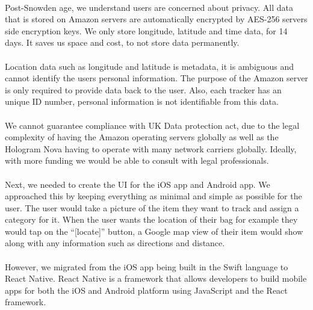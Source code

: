 \documentclass[12pt,a4paper]{article}
\begin{document}
        \paragraph{} Post-Snowden age, we understand users are concerned about privacy. All data that is stored on Amazon servers are automatically encrypted by AES-256 servers side encryption keys. We only store longitude, latitude and time data, for 14 days. It saves us space and cost, to not store data permanently.
        
        \paragraph{} Location data such as longitude and latitude is metadata, it is ambiguous and cannot identify the users personal information. The purpose of the Amazon server is only required to provide data back to the user. Also, each tracker has an unique ID number, personal information is not identifiable from this data. 
        
        \paragraph{} We cannot guarantee compliance with UK Data protection act, due to the legal complexity of having the Amazon operating servers globally as well as the Hologram Nova having to operate with many network carriers globally. Ideally, with more funding we would be able to consult with legal professionals. 
        
        \paragraph{} Next, we needed to create the UI for the iOS app and Android app. We approached this by keeping everything as minimal and simple as possible for the user. The user would take a picture of the item they want to track and assign a category for it. When the user wants the location of their bag for example they would tap on the “[locate]” button, a Google map view of their item would show along with any information such as directions and distance. 
        
        \paragraph{} However, we migrated from the iOS app being built in the Swift language to React Native. React Native is a framework that allows developers to build mobile apps for both the iOS and Android platform using JavaScript and the React framework. 
        
\end{document}
